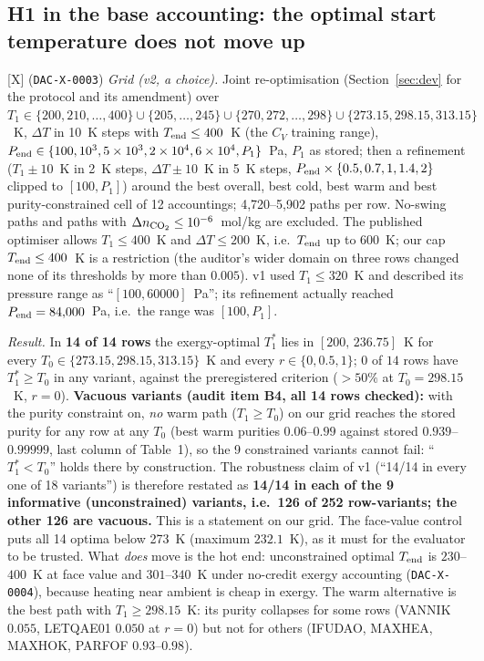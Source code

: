 \documentclass[10pt]{article}
\newcommand{\tier}[1]{\textsf{[#1]}}
\newcommand{\tX}{\tier{X}}
\newcommand{\id}[1]{\texttt{DAC-#1}}
\begin{document}
\subsection{H1 in the base accounting: the optimal start temperature does not move up}
\tX{} (\id{X-0003}) \emph{Grid (v2, a choice).} Joint re-optimisation (Section~\ref{sec:dev} for the protocol and its amendment) over $T_1\in\{200,210,\ldots,400\}\cup\{205,\ldots,245\}\cup\{270,272,\ldots,298\}\cup\{273.15,298.15,313.15\}$~K, $\Delta T$ in 10~K steps with $T_{\rm end}\le400$~K (the $C_V$ training range), $P_{\rm end}\in\{100,10^3,5\times10^3,2\times10^4,6\times10^4,P_1\}$~Pa, $P_1$ as stored; then a refinement ($T_1\pm10$~K in 2~K steps, $\Delta T\pm10$~K in 5~K steps, $P_{\rm end}\times\{0.5,0.7,1,1.4,2\}$ clipped to $[100,P_1]$) around the best overall, best cold, best warm and best purity-constrained cell of 12 accountings; 4,720--5,902 paths per row. No-swing paths and paths with $\Delta n_{\rm CO_2}\le10^{-6}$~mol/kg are excluded. The published optimiser allows $T_1\le400$~K and $\Delta T\le200$~K, i.e.\ $T_{\rm end}$ up to 600~K; our cap $T_{\rm end}\le400$~K is a restriction (the auditor's wider domain on three rows changed none of its thresholds by more than $0.005$). v1 used $T_1\le320$~K and described its pressure range as ``$[100,60000]$~Pa''; its refinement actually reached $P_{\rm end}=84{,}000$~Pa, i.e.\ the range was $[100,P_1]$.

\emph{Result.} In \textbf{14 of 14 rows} the exergy-optimal $T_1^\ast$ lies in $[200,\,236.75]$~K for every $T_0\in\{273.15,298.15,313.15\}$~K and every $r\in\{0,0.5,1\}$; $0$ of $14$ rows have $T_1^\ast\ge T_0$ in any variant, against the preregistered criterion ($>50\%$ at $T_0=298.15$~K, $r=0$). \textbf{Vacuous variants (audit item B4, all 14 rows checked):} with the purity constraint on, \emph{no} warm path ($T_1\ge T_0$) on our grid reaches the stored purity for any row at any $T_0$ (best warm purities $0.06$--$0.99$ against stored $0.939$--$0.99999$, last column of Table~1), so the 9 constrained variants cannot fail: ``$T_1^\ast<T_0$'' holds there by construction. The robustness claim of v1 (``14/14 in every one of 18 variants'') is therefore restated as \textbf{14/14 in each of the 9 informative (unconstrained) variants, i.e.\ 126 of 252 row-variants; the other 126 are vacuous.} This is a statement on our grid.
The face-value control puts all 14 optima below 273~K (maximum $232.1$~K), as it must for the evaluator to be trusted.
What \emph{does} move is the hot end: unconstrained optimal $T_{\rm end}$ is $230$--$400$~K at face value and $301$--$340$~K under no-credit exergy accounting (\id{X-0004}), because heating near ambient is cheap in exergy. The warm alternative is the best path with $T_1\ge298.15$~K: its purity collapses for some rows (VANNIK $0.055$, LETQAE01 $0.050$ at $r=0$) but not for others (IFUDAO, MAXHEA, MAXHOK, PARFOF $0.93$--$0.98$).
\end{document}
